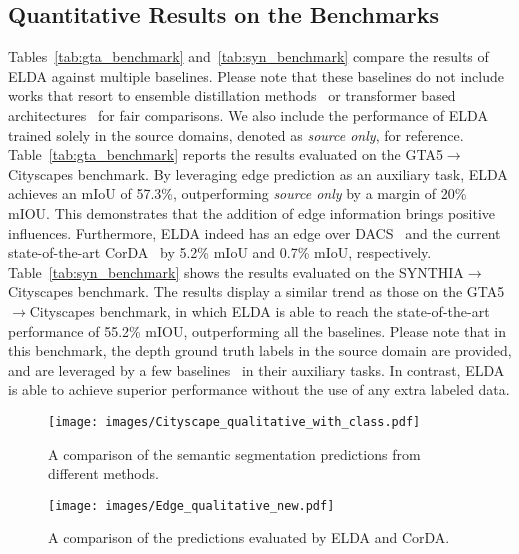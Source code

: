 \documentclass{bmvc2k}
\begin{document}
\subsection{Quantitative Results on the Benchmarks}
\label{subsec::quantitative_results}
Tables~\ref{tab:gta_benchmark} and~\ref{tab:syn_benchmark} compare the results of ELDA against multiple baselines. Please note that these baselines do not include works that resort to ensemble distillation methods~\cite{zhang2021prototypical,Chao_2021_CVPR,DBLP:journals/corr/abs-2112-00295} or transformer based architectures~\cite{hoyer2021daformer} for fair comparisons. We also include the performance of ELDA trained solely in the source domains, denoted as \textit{source only}, for reference.
Table~\ref{tab:gta_benchmark} reports the results evaluated on the GTA5$\to$Cityscapes benchmark. By leveraging edge prediction as an auxiliary task, ELDA achieves an mIoU of 57.3\%, outperforming \textit{source only} by a margin of 20\% mIOU. This demonstrates that the addition of edge information brings positive influences. Furthermore, ELDA indeed has an edge over DACS~\cite{tranheden2020dacs} and the current state-of-the-art CorDA~\cite{wang2021domain} by 5.2\% mIoU and 0.7\% mIoU, respectively. Table~\ref{tab:syn_benchmark} shows the results evaluated on the SYNTHIA$\to$Cityscapes benchmark. The results display a similar trend as those on the GTA5$\to$Cityscapes benchmark, in which ELDA is able to reach the state-of-the-art performance of 55.2\% mIOU, outperforming all the baselines. Please note that in this benchmark, the depth ground truth labels in the source domain are provided, and are leveraged by a few baselines~\cite{vu2019dada,Lee2019SPIGANPA,Chen_2019_GIOada,Saha_2021_CVPR_CTRL,guizilini2021geometric,wang2021domain} in their auxiliary tasks. In contrast, ELDA is able to achieve superior performance without the use of any extra labeled data.




\begin{figure}[t]
  \centering
  \texttt{[image: images/Cityscape\_qualitative\_with\_class.pdf]}
  \caption{A comparison of the semantic segmentation predictions from different methods. 
}
  \label{fig:Seg_Qualitative_Result}
\end{figure}

\begin{figure}[t]
  \centering
  \texttt{[image: images/Edge\_qualitative\_new.pdf]}
  \caption{
  A comparison of the predictions evaluated by ELDA and CorDA.
}
  \label{fig:Edge_Qualitative_Result}
\end{figure}
\end{document}
